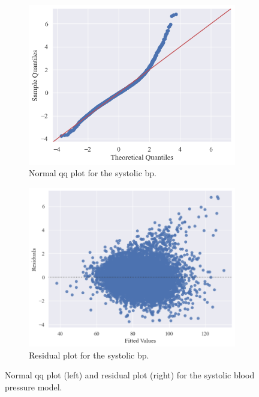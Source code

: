 \documentclass[12 pt]{scrartcl}
\numberwithin{equation}{section}
\begin{document}
\begin{figure}[H]
    \centering
    \begin{subfigure}[b]{0.49\textwidth}
        \includegraphics[width=\textwidth]{images/qqplot-dia.png}
        \caption{Normal qq plot for the systolic bp.}
        \label{fig:subplot13}
    \end{subfigure}
    \hfill
    \begin{subfigure}[b]{0.49\textwidth}
        \includegraphics[width=\textwidth]{images/residual-plot-dia.png}
        \caption{Residual plot for the systolic bp.}
        \label{fig:subplot14}
    \end{subfigure}
    \caption{Normal qq plot (left) and residual plot (right) for the systolic blood pressure model.}
\end{figure}
\end{document}
